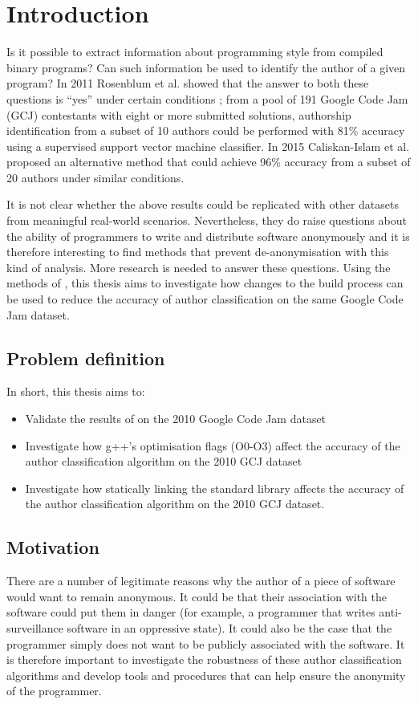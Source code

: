 \documentclass[a4paper,11pt]{kth-mag}
\begin{document}
\chapter{Introduction}
Is it possible to extract information about programming style from compiled
binary programs? Can such information be used to identify the author of a given
program? In 2011 Rosenblum et al. showed that the answer to both these
questions is “yes” under certain conditions \parencite{rosenblum2011wrote};
from a pool of 191 Google Code Jam (GCJ) contestants with eight or more
submitted solutions, authorship identification from a subset of 10 authors could
be performed with 81\% accuracy using a supervised support vector machine
classifier. In 2015 Caliskan-Islam et al. proposed an alternative method that
could achieve 96\% accuracy from a subset of 20 authors
\parencite{caliskan2015coding} under similar conditions.

It is not clear whether the above results could be replicated with
other datasets from meaningful real-world scenarios. Nevertheless, they do
raise questions about the ability of programmers to write and distribute
software anonymously and it is therefore interesting to find methods that prevent
de-anonymisation with this kind of analysis. More research is needed to answer these questions. 
Using the methods of
\parencite{rosenblum2011wrote}, this thesis aims to investigate how changes to
the build process can be used to reduce the accuracy of author classification
on the same Google Code Jam dataset.

\section{Problem definition} In short, this thesis aims to:
\begin{itemize}
\item Validate the results of \parencite{rosenblum2011wrote} on the 2010 Google
      Code Jam dataset
\item Investigate how g++’s optimisation flags (O0-O3) affect the accuracy of
      the author classification algorithm on the 2010 GCJ dataset
\item Investigate how statically linking the standard library affects the
      accuracy of the author classification algorithm on the 2010 GCJ dataset.
\end{itemize}

\section{Motivation}
There are a number of legitimate reasons why the author of a piece of software
would want to remain anonymous. It could be that their association with the
software could put them in danger (for example, a programmer that writes
anti-surveillance software in an oppressive state). It could also be the case
that the programmer simply does not want to be publicly associated with the
software. It is therefore important to investigate the robustness of these author
classification algorithms and develop tools and procedures that can help
ensure the anonymity of the programmer.
\end{document}
